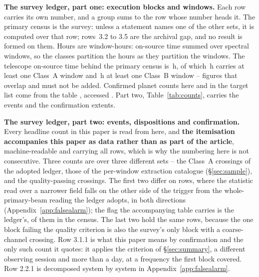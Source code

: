 \begin{table}
\centering
\scriptsize
\caption{\textbf{The survey ledger, part one: execution blocks and windows.}
Each row carries its own number, and a group sums to the row whose number
heads it. The
primary census is the survey: unless a statement names one of the other sets,
it is computed over that row; rows~3.2 to 3.5 are the archival gap, and no
result is formed on them. Hours are window-hours: on-source time summed
over spectral windows, so the classes partition the hours as they partition
the windows. The telescope on-source time behind the primary census is
\StTelHours\,h, of which \StTelHoursFine\,h carries at least one Class~A
window and \StTelHoursCoarse\,h at least one Class~B window -- figures that
overlap and must not be added. Confirmed planet counts here and in the
target list come from the \SfHostCatalogue{} \SfHostTable{} table
\citep{NEA2013}, accessed \SfHostDate. Part two, Table~\ref{tab:counts},
carries the events and the confirmation extents.}
\label{tab:blockledger}

\end{table}

\begin{table}
\centering
\scriptsize
\caption{\textbf{The survey ledger, part two: events, dispositions and
confirmation.} Every headline count in this paper is read from here, and
\textbf{the itemisation accompanies this paper
as data rather than as part of the article}, machine-readable and carrying all
\MtCountRows{} rows, which is why the numbering here is not consecutive. Three
counts are \MtCrossA{} over three different sets -- the Class~A crossings of
the adopted ledger, those of the per-window extraction catalogue
(\S\ref{sec:sample}), and the
quality-passing crossings. The first two differ on \FrNFlag{} rows, where the
statistic read over a narrower field falls on the other side of the trigger
from the whole-primary-beam reading the ledger adopts, in both directions
(Appendix~\ref{app:falsealarm}); the flag the accompanying table carries is
the ledger's, \MtCrossACen{} of them in the census. The last two hold the same rows,
because the one block failing the quality criterion is also the survey's only
block with a coarse-channel crossing. Row 3.1.1 is what this
paper means by confirmation and the only such count it quotes: it applies the
criterion of \S\ref{sec:summary}, a different observing session and more than
a day, at a frequency the first block covered. Row 2.2.1 is
decomposed system by system in Appendix~\ref{app:falsealarm}.}
\label{tab:counts}

\end{table}

